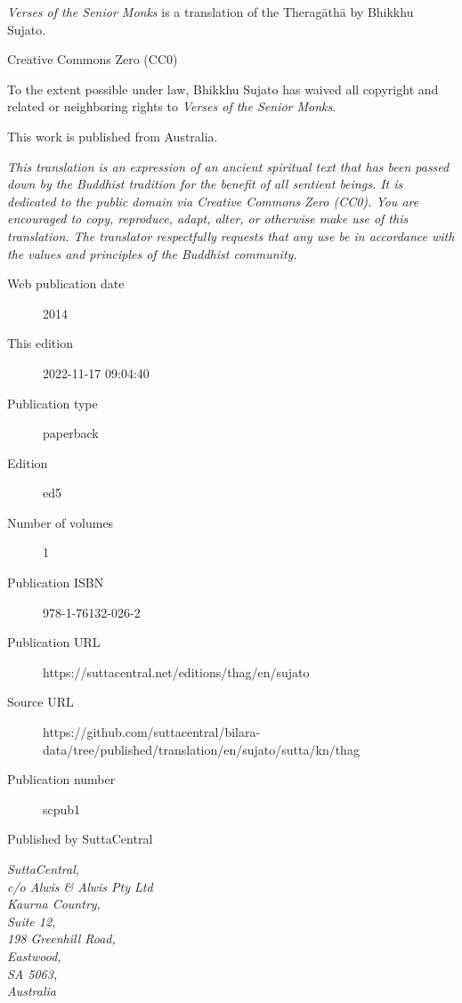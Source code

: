 \documentclass[12pt,openany]{book}%
\begin{document}
\begin{footnotesize}

\textit{Verses of the Senior Monks} is a translation of the Theragāthā by Bhikkhu Sujato.

\medskip

Creative Commons Zero (CC0)

To the extent possible under law, Bhikkhu Sujato has waived all copyright and related or neighboring rights to \textit{Verses of the Senior Monks}.

\medskip

This work is published from Australia.

\begin{center}
\textit{This translation is an expression of an ancient spiritual text that has been passed down by the Buddhist tradition for the benefit of all sentient beings. It is dedicated to the public domain via Creative Commons Zero (CC0). You are encouraged to copy, reproduce, adapt, alter, or otherwise make use of this translation. The translator respectfully requests that any use be in accordance with the values and principles of the Buddhist community.}
\end{center}

\medskip

\begin{description}
    \item[Web publication date] 2014
    \item[This edition] 2022-11-17 09:04:40
    \item[Publication type] paperback
    \item[Edition] ed5
    \item[Number of volumes] 1
    \item[Publication ISBN] 978-1-76132-026-2
    \item[Publication URL] https://suttacentral.net/editions/thag/en/sujato
    \item[Source URL] https://github.com/suttacentral/bilara-data/tree/published/translation/en/sujato/sutta/kn/thag
    \item[Publication number] scpub1
\end{description}

\medskip

Published by SuttaCentral

\medskip

\textit{SuttaCentral,\\
c/o Alwis \& Alwis Pty Ltd\\
Kaurna Country,\\
Suite 12,\\
198 Greenhill Road,\\
Eastwood,\\
SA 5063,\\
Australia}

\end{footnotesize}
\end{document}
